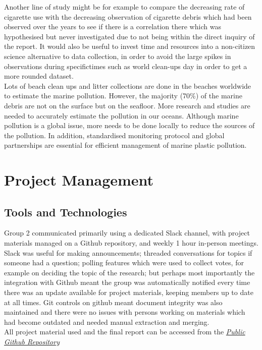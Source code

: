 \documentclass[10pt]{article}\usepackage[]{graphicx}\usepackage[]{color}
\begin{document}
Another line of study might be for example to compare the decreasing rate of cigarette use with the decreasing observation of cigarette debris which had been observed over the years to see if there is a correlation there which was hypothesised but never investigated due to not being within the direct inquiry of the report. It would also be useful to invest time and resources into a non-citizen science alternative to data collection, in order to avoid the large spikes in observations during specifictimes such as world clean-ups day in order to get a more rounded dataset.   \\  

Lots of beach clean ups and litter collections are done in the beaches worldwide to estimate the marine pollution. However, the majority (70\%) of the marine debris are not on the surface but on the seafloor. More research and studies are needed to accurately estimate the pollution in our oceans. Although marine pollution is a global issue, more needs to be done locally to reduce the sources of the pollution. In addition, standardised monitoring protocol and global partnerships are essential for efficient management of marine plastic pollution. \\


\pagebreak
\section{Project Management}\label{mgt}
\subsection{Tools and Technologies}

Group 2 communicated primarily using a dedicated Slack channel, with project materials managed on a Github repository, and weekly 1 hour in-person meetings. Slack was useful for making announcements; threaded conversations for topics if someone had a question; polling features which were used to collect votes, for example on deciding the topic of the research; but perhaps most importantly the integration with Github meant the group was automatically notified every time there was an update available for project materials, keeping members up to date at all times. Git controls on github meant document integrity was also maintained and there were no issues with persons working on materials which had become outdated and needed manual extraction and merging.\\

All project material used and the final report can be accessed from the \textit{\href{https://github.com/KarenJewell/CMM507Group2}{Public Github Repository}} \\
\end{document}
